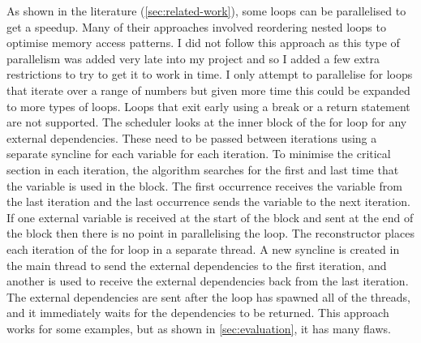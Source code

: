 As shown in the literature (\autoref{sec:related-work}), some loops can be parallelised to get a speedup. Many of their approaches involved reordering nested loops to optimise memory access patterns. I did not follow this approach as this type of parallelism was added very late into my project and so I added a few extra restrictions to try to get it to work in time. I only attempt to parallelise for loops that iterate over a range of numbers but given more time this could be expanded to more types of loops. Loops that exit early using a break or a return statement are not supported. The scheduler looks at the inner block of the for loop for any external dependencies. These need to be passed between iterations using a separate syncline for each variable for each iteration. To minimise the critical section in each iteration, the algorithm searches for the first and last time that the variable is used in the block. The first occurrence receives the variable from the last iteration and the last occurrence sends the variable to the next iteration. If one external variable is received at the start of the block and sent at the end of the block then there is no point in parallelising the loop. The reconstructor places each iteration of the for loop in a separate thread. A new syncline is created in the main thread to send the external dependencies to the first iteration, and another is used to receive the external dependencies back from the last iteration. The external dependencies are sent after the loop has spawned all of the threads, and it immediately waits for the dependencies to be returned. This approach works for some examples, but as shown in \autoref{sec:evaluation}, it has many flaws.

\begin{comment}
\begin{code}
\begin{verbatim}
let a; // Local without init
a = {
    let b = vec![1,2,3]; // Local with init
    println!("{:?}", b); // Mac
    b.len() // Expr
}; // Semi
\end{verbatim}
\caption{Example showing different StmtKinds}
\end{code}
\end{comment}

